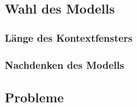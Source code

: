 \documentclass[../../main.tex]{subfiles}
\begin{document}
\begin{doublespace}
  \subsection{Wahl des Modells}
  \subsubsection{Länge des Kontextfensters}
  \subsubsection{Nachdenken des Modells}

  
  

  \subsection{Probleme}
\end{doublespace}
\end{document}

